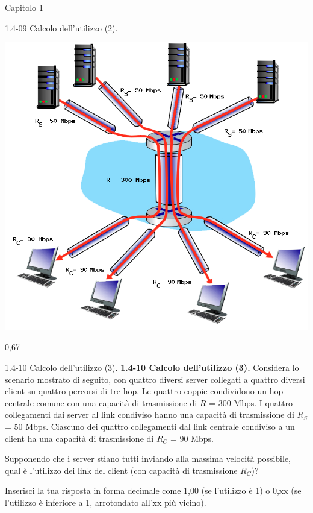 \documentclass[a4paper]{article}
\begin{document}
\begin{quiz}{Capitolo 1}
\begin{shortanswer}[points=1,shuffle=true]{1.4-09 Calcolo dell'utilizzo (2).}
\begin{center}
\includegraphics[width=0.7\linewidth]{figs/1.4.7.png}
\end{center}
\item 0,67
\end{shortanswer}

\begin{shortanswer}[points=1,shuffle=true]{1.4-10 Calcolo dell'utilizzo (3).}
\textbf{1.4-10 Calcolo dell'utilizzo (3).}
Considera lo scenario mostrato di seguito, con quattro diversi server collegati a quattro diversi client su quattro percorsi di tre hop. Le quattro coppie condividono un hop centrale comune con una capacità di trasmissione di $R$ = 300 Mbps. I quattro collegamenti dai server al link condiviso hanno una capacità di trasmissione di $R_S$ = 50 Mbps. Ciascuno dei quattro collegamenti dal link centrale condiviso a un client ha una capacità di trasmissione di $R_C$ = 90 Mbps.

Supponendo che i server stiano tutti inviando alla massima velocità possibile, qual è l'utilizzo dei link del client (con capacità di trasmissione $R_C$)?

Inserisci la tua risposta in forma decimale come 1,00 (se l'utilizzo è 1) o 0,xx (se l'utilizzo è inferiore a 1, arrotondato all'xx più vicino).


\end{shortanswer}
\end{quiz}
\end{document}
